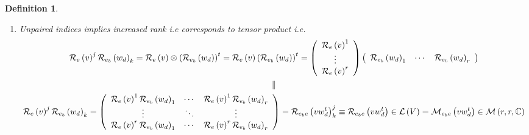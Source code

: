 \documentclass[aps,preprint]{revtex4}%
\newtheorem{definition}[theorem]{Definition}
\begin{document}
\begin{definition}
\begin{enumerate}
\begin{enumerate}
\item Unpaired indices implies increased rank i.e corresponds to tensor
product i.e.
\begin{gather}
\mathcal{R}_{e}\left(  v\right)  ^{j}\mathcal{R}_{e_{b}}\left(  w_{d}\right)
_{k}=\mathcal{R}_{e}\left(  v\right)  \otimes\left(  \mathcal{R}_{e_{b}%
}\left(  w_{d}\right)  \right)  ^{t}=\mathcal{R}_{e}\left(  v\right)  \left(
\mathcal{R}_{e_{b}}\left(  w_{d}\right)  \right)  ^{t}=\left(
\begin{array}
[c]{c}%
\mathcal{R}_{e}\left(  v\right)  ^{1}\\
\vdots\\
\mathcal{R}_{e}\left(  v\right)  ^{r}%
\end{array}
\right)  \left(
\begin{array}
[c]{ccc}%
\mathcal{R}_{e_{b}}\left(  w_{d}\right)  _{1} & \cdots & \mathcal{R}_{e_{b}%
}\left(  w_{d}\right)  _{r}%
\end{array}
\right)  \\
\parallel\\
\mathcal{R}_{e}\left(  v\right)  ^{j}\mathcal{R}_{e_{b}}\left(  w_{d}\right)
_{k}=\left(
\begin{array}
[c]{ccc}%
\mathcal{R}_{e}\left(  v\right)  ^{1}\mathcal{R}_{e_{b}}\left(  w_{d}\right)
_{1} & \cdots & \mathcal{R}_{e}\left(  v\right)  ^{1}\mathcal{R}_{e_{b}%
}\left(  w_{d}\right)  _{r}\\
\vdots & \ddots & \vdots\\
\mathcal{R}_{e}\left(  v\right)  ^{r}\mathcal{R}_{e_{b}}\left(  w_{d}\right)
_{1} & \cdots & \mathcal{R}_{e}\left(  v\right)  ^{r}\mathcal{R}_{e_{b}%
}\left(  w_{d}\right)  _{r}%
\end{array}
\right)  =\mathcal{R}_{e_{b}e}\left(  vw_{d}^{t}\right)  _{k}^{j}%
\equiv\mathcal{R}_{e_{b}e}\left(  vw_{d}^{t}\right)  \in\mathcal{L}\left(
V\right)  =\mathcal{M}_{e_{b}e}\left(  vw_{d}^{t}\right)  \in\mathcal{M}%
\left(  r,r,\mathbb{C}\right)
\end{gather}



\end{enumerate}
\end{enumerate}
\end{definition}
\end{document}
